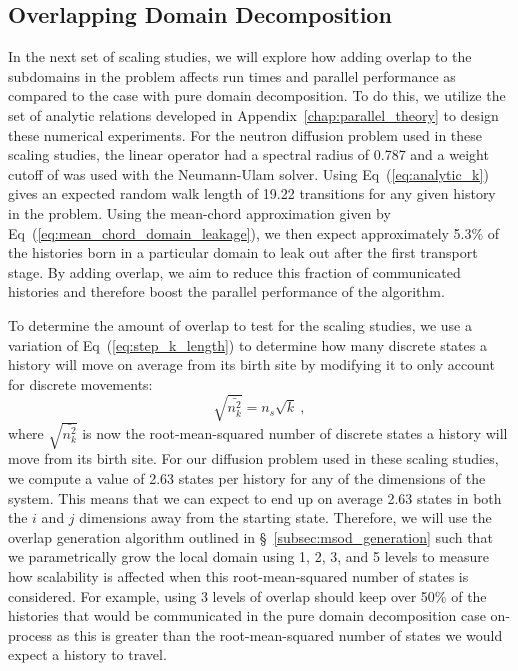 \documentclass{snamc2013}
\begin{document}
\subsection{Overlapping Domain Decomposition}
\label{subsec:overlapping_domain_decomp}
In the next set of scaling studies, we will explore how adding overlap
to the subdomains in the problem affects run times and parallel
performance as compared to the case with pure domain decomposition. To
do this, we utilize the set of analytic relations developed in
Appendix~\ref{chap:parallel_theory} to design these numerical
experiments. For the neutron diffusion problem used in these scaling
studies, the linear operator had a spectral radius of 0.787 and a
weight cutoff of  was used with the Neumann-Ulam
solver. Using Eq~(\ref{eq:analytic_k}) gives an expected random walk
length of 19.22 transitions for any given history in the
problem. Using the mean-chord approximation given by
Eq~(\ref{eq:mean_chord_domain_leakage}), we then expect approximately
5.3\% of the histories born in a particular domain to leak out after
the first transport stage. By adding overlap, we aim to reduce this
fraction of communicated histories and therefore boost the parallel
performance of the algorithm.

To determine the amount of overlap to test for the scaling studies, we
use a variation of Eq~(\ref{eq:step_k_length}) to determine how many
discrete states a history will move on average from its birth site by
modifying it to only account for discrete movements:
\begin{equation}
  \sqrt{\bar{n^2_k}} = n_s \sqrt{k}\:,
  \label{eq:discrete_distance}
\end{equation}
where $\sqrt{\bar{n^2_k}}$ is now the root-mean-squared number of
discrete states a history will move from its birth site. For our
diffusion problem used in these scaling studies, we compute a value of
2.63 states per history for any of the dimensions of the system. This
means that we can expect to end up on average 2.63 states in both the
$i$ and $j$ dimensions away from the starting state. Therefore, we
will use the overlap generation algorithm outlined in
\S~\ref{subsec:msod_generation} such that we parametrically grow the
local domain using 1, 2, 3, and 5 levels to measure how scalability is
affected when this root-mean-squared number of states is
considered. For example, using 3 levels of overlap should keep over
50\% of the histories that would be communicated in the pure domain
decomposition case on-process as this is greater than the
root-mean-squared number of states we would expect a history to
travel.
\end{document}
